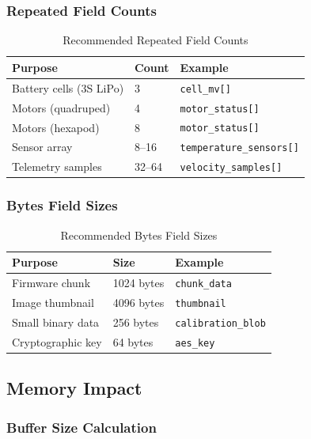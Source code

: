 \subsubsection{Repeated Field Counts}

\begin{table}[H]
\centering
\caption{Recommended Repeated Field Counts}
\label{tab:repeated-counts}
\begin{tabular}{|l|l|l|}
\hline
\textbf{Purpose} & \textbf{Count} & \textbf{Example} \\
\hline
Battery cells (3S LiPo) & 3 & \texttt{cell\_mv[]} \\
\hline
Motors (quadruped) & 4 & \texttt{motor\_status[]} \\
\hline
Motors (hexapod) & 8 & \texttt{motor\_status[]} \\
\hline
Sensor array & 8--16 & \texttt{temperature\_sensors[]} \\
\hline
Telemetry samples & 32--64 & \texttt{velocity\_samples[]} \\
\hline
\end{tabular}
\end{table}

\subsubsection{Bytes Field Sizes}

\begin{table}[H]
\centering
\caption{Recommended Bytes Field Sizes}
\label{tab:bytes-sizes}
\begin{tabular}{|l|l|l|}
\hline
\textbf{Purpose} & \textbf{Size} & \textbf{Example} \\
\hline
Firmware chunk & 1024 bytes & \texttt{chunk\_data} \\
\hline
Image thumbnail & 4096 bytes & \texttt{thumbnail} \\
\hline
Small binary data & 256 bytes & \texttt{calibration\_blob} \\
\hline
Cryptographic key & 64 bytes & \texttt{aes\_key} \\
\hline
\end{tabular}
\end{table}

\subsection{Memory Impact}

\subsubsection{Buffer Size Calculation}

